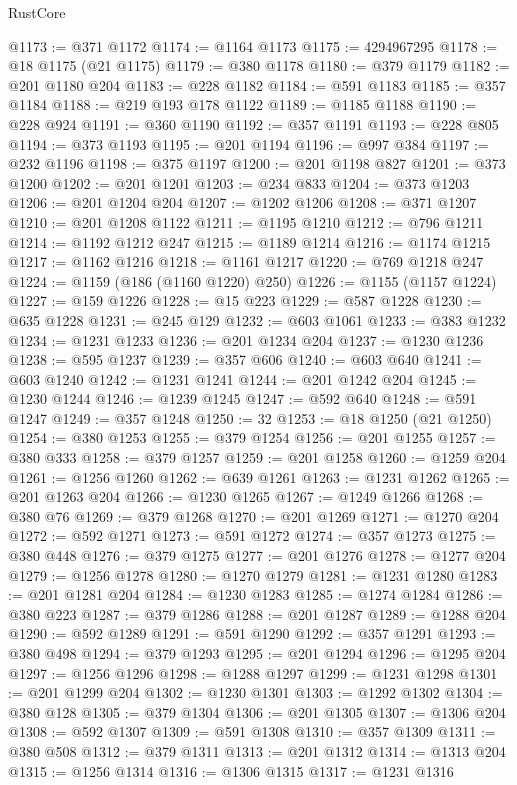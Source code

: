 \begin{lexlean}{RustCore}
\begin{coremodule}
@1173 := @371 @1172
@1174 := @1164 @1173
@1175 := 4294967295
@1178 := @18 @1175 (@21 @1175)
@1179 := @380 @1178
@1180 := @379 @1179
@1182 := @201 @1180 @204
@1183 := @228 @1182
@1184 := @591 @1183
@1185 := @357 @1184
@1188 := @219 @193 @178 @1122
@1189 := @1185 @1188
@1190 := @228 @924
@1191 := @360 @1190
@1192 := @357 @1191
@1193 := @228 @805
@1194 := @373 @1193
@1195 := @201 @1194
@1196 := @997 @384
@1197 := @232 @1196
@1198 := @375 @1197
@1200 := @201 @1198 @827
@1201 := @373 @1200
@1202 := @201 @1201
@1203 := @234 @833
@1204 := @373 @1203
@1206 := @201 @1204 @204
@1207 := @1202 @1206
@1208 := @371 @1207
@1210 := @201 @1208 @1122
@1211 := @1195 @1210
@1212 := @796 @1211
@1214 := @1192 @1212 @247
@1215 := @1189 @1214
@1216 := @1174 @1215
@1217 := @1162 @1216
@1218 := @1161 @1217
@1220 := @769 @1218 @247
@1224 := @1159 (@186 (@1160 @1220) @250)
@1226 := @1155 (@1157 @1224)
@1227 := @159 @1226
@1228 := @15 @223
@1229 := @587 @1228
@1230 := @635 @1228
@1231 := @245 @129
@1232 := @603 @1061
@1233 := @383 @1232
@1234 := @1231 @1233
@1236 := @201 @1234 @204
@1237 := @1230 @1236
@1238 := @595 @1237
@1239 := @357 @606
@1240 := @603 @640
@1241 := @603 @1240
@1242 := @1231 @1241
@1244 := @201 @1242 @204
@1245 := @1230 @1244
@1246 := @1239 @1245
@1247 := @592 @640
@1248 := @591 @1247
@1249 := @357 @1248
@1250 := 32
@1253 := @18 @1250 (@21 @1250)
@1254 := @380 @1253
@1255 := @379 @1254
@1256 := @201 @1255
@1257 := @380 @333
@1258 := @379 @1257
@1259 := @201 @1258
@1260 := @1259 @204
@1261 := @1256 @1260
@1262 := @639 @1261
@1263 := @1231 @1262
@1265 := @201 @1263 @204
@1266 := @1230 @1265
@1267 := @1249 @1266
@1268 := @380 @76
@1269 := @379 @1268
@1270 := @201 @1269
@1271 := @1270 @204
@1272 := @592 @1271
@1273 := @591 @1272
@1274 := @357 @1273
@1275 := @380 @448
@1276 := @379 @1275
@1277 := @201 @1276
@1278 := @1277 @204
@1279 := @1256 @1278
@1280 := @1270 @1279
@1281 := @1231 @1280
@1283 := @201 @1281 @204
@1284 := @1230 @1283
@1285 := @1274 @1284
@1286 := @380 @223
@1287 := @379 @1286
@1288 := @201 @1287
@1289 := @1288 @204
@1290 := @592 @1289
@1291 := @591 @1290
@1292 := @357 @1291
@1293 := @380 @498
@1294 := @379 @1293
@1295 := @201 @1294
@1296 := @1295 @204
@1297 := @1256 @1296
@1298 := @1288 @1297
@1299 := @1231 @1298
@1301 := @201 @1299 @204
@1302 := @1230 @1301
@1303 := @1292 @1302
@1304 := @380 @128
@1305 := @379 @1304
@1306 := @201 @1305
@1307 := @1306 @204
@1308 := @592 @1307
@1309 := @591 @1308
@1310 := @357 @1309
@1311 := @380 @508
@1312 := @379 @1311
@1313 := @201 @1312
@1314 := @1313 @204
@1315 := @1256 @1314
@1316 := @1306 @1315
@1317 := @1231 @1316

\end{coremodule}
\end{lexlean}
